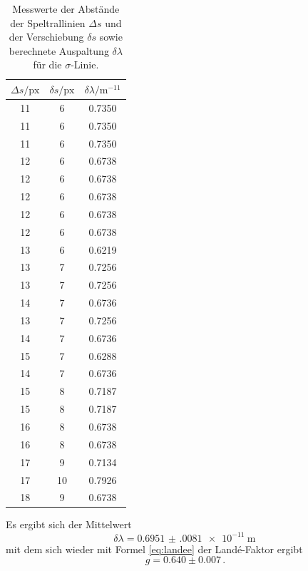 \begin{table}[h]
    \centering
    \caption{Messwerte der Abstände der Speltrallinien $\Delta s$ und der Verschiebung $\delta s$ sowie berechnete Auspaltung $\delta \lambda$ für die $\sigma$-Linie.}
    \label{tab:atab4}
    \begin{tabular}{c c c}
        \toprule
        {$\Delta s / \text{px}$} & {$\delta s / \text{px}$} & {$\delta \lambda / \si{\meter}^{-11}$}\\
        \midrule
        11 & 6  & 0.7350 \\
        11 & 6  & 0.7350 \\
        11 & 6  & 0.7350 \\
        12 & 6  & 0.6738 \\
        12 & 6  & 0.6738 \\
        12 & 6  & 0.6738 \\
        12 & 6  & 0.6738 \\
        12 & 6  & 0.6738 \\
        13 & 6  & 0.6219 \\
        13 & 7  & 0.7256 \\
        13 & 7  & 0.7256 \\
        14 & 7  & 0.6736 \\
        13 & 7  & 0.7256 \\
        14 & 7  & 0.6736 \\
        15 & 7  & 0.6288 \\
        14 & 7  & 0.6736 \\
        15 & 8  & 0.7187 \\
        15 & 8  & 0.7187 \\
        16 & 8  & 0.6738 \\
        16 & 8  & 0.6738 \\
        17 & 9  & 0.7134 \\
        17 & 10 & 0.7926 \\
        18 & 9  & 0.6738 \\
        \bottomrule
    \end{tabular}
\end{table}
\FloatBarrier
\noindent
Es ergibt sich der Mittelwert
\begin{equation*}
    \delta \lambda = \SI{0.6951(0081)e-11}{\meter} \, 
\end{equation*}
mit dem sich wieder mit Formel \eqref{eq:landee} der Landé-Faktor ergibt
\begin{equation*}
    g = 0.640 \pm 0.007 \, .
\end{equation*}



\nocite{wingate}
\nocite{*}
\printbibliography

